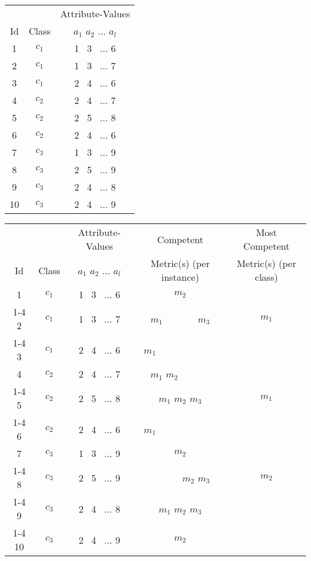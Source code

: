 \begin{table*} [htp!]
\begin{minipage}[b]{0.27\linewidth}
\centering
\begin{tabular}{|c|c|c|} \hline
  &     &Attribute-Values\\
Id&Class&$a_1$ $a_2$ $\ldots$ $a_l$\\ \hline\hline
1 &$c_1$&1~ 3~ $\ldots$ 6\\ \hline
2 &$c_1$&1~ 3~ $\ldots$ 7\\ \hline
3 &$c_1$&2~ 4~ $\ldots$ 6\\ \hline
4 &$c_2$&2~ 4~ $\ldots$ 7\\ \hline
5 &$c_2$&2~ 5~ $\ldots$ 8\\ \hline
6 &$c_2$&2~ 4~ $\ldots$ 6\\ \hline
7 &$c_3$&1~ 3~ $\ldots$ 9\\ \hline
8 &$c_3$&2~ 5~ $\ldots$ 9\\ \hline
9 &$c_3$&2~ 4~ $\ldots$ 8\\ \hline
10&$c_3$&2~ 4~ $\ldots$ 9\\ \hline
\end{tabular}
\caption{Training Data, $\mathcal{D}$.}
\label{table:ex1}
\end{minipage}
\begin{minipage}[b]{0.77\linewidth}
\centering
\begin{tabular}{|c|c|c|c|c|} \hline
  &     & Attribute-Values & Competent & Most Competent \\
Id&Class&$a_1$ $a_2$ $\ldots$ $a_l$ & Metric(s) (per instance) & Metric(s) (per class)\\ \hline\hline
1 &$c_1$&1~ 3~ $\ldots$ 6           & $m_2$               &       \\ \cline{1-4}
2 &$c_1$&1~ 3~ $\ldots$ 7           & $m_1$ ~~~~~~ $m_3$  & $m_1$ \\ \cline{1-4}
3 &$c_1$&2~ 4~ $\ldots$ 6           & $m_1$ ~~~~~~~~~~~~  &       \\ \hline
4 &$c_2$&2~ 4~ $\ldots$ 7           & $m_1$ $m_2$ ~~~~~~  &       \\ \cline{1-4}
5 &$c_2$&2~ 5~ $\ldots$ 8           & $m_1$ $m_2$ $m_3$   & $m_1$ \\ \cline{1-4}
6 &$c_2$&2~ 4~ $\ldots$ 6           & $m_1$ ~~~~~~~~~~~~  &       \\ \hline
7 &$c_3$&1~ 3~ $\ldots$ 9           & $m_2$               &       \\ \cline{1-4}
8 &$c_3$&2~ 5~ $\ldots$ 9           & ~~~~~~ $m_2$ $m_3$  & $m_2$ \\ \cline{1-4}
9 &$c_3$&2~ 4~ $\ldots$ 8           & $m_1$ $m_2$ $m_3$   &       \\ \cline{1-4}
10&$c_3$&2~ 4~ $\ldots$ 9           & $m_2$               &       \\ \hline
\end{tabular}
\caption{Enhanced Training Data, $\mathcal{D}_e$.}
\label{table:ex4}
\end{minipage}
\end{table*}


